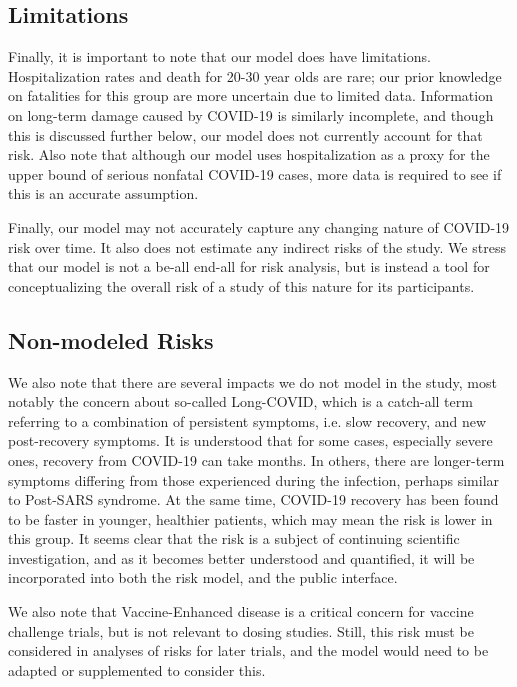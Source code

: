 \documentclass{article}
\begin{document}
\subsection{Limitations}

Finally, it is important to note that our model does have limitations. Hospitalization rates and death for 20-30 year olds are rare; our prior knowledge on fatalities for this group are more uncertain due to limited data. Information on long-term damage caused by COVID-19 is similarly incomplete, and though this is discussed further below, our model does not currently account for that risk. Also note that although our model uses hospitalization as a proxy for the upper bound of serious nonfatal COVID-19 cases, more data is required to see if this is an accurate assumption. 

Finally, our model may not accurately capture any changing nature of COVID-19 risk over time. It also does not estimate any indirect risks of the study. 
We stress that our model is not a be-all end-all for risk analysis, but is instead a tool for conceptualizing the overall risk of a study of this nature for its participants.

\subsection{Non-modeled Risks}

We also note that there are several impacts we do not model in the study, most notably the concern about so-called Long-COVID, which is a catch-all term referring to a combination of persistent symptoms, i.e. slow recovery, and new post-recovery symptoms\cite{carfi2020persistent}. It is understood that for some cases, especially severe ones, recovery from COVID-19 can take months. In others, there are longer-term symptoms differing from those experienced during the infection, perhaps similar to Post-SARS syndrome\cite{perrin2020into, moldofsky2011chronic}. At the same time, COVID-19 recovery has been found to be faster in younger, healthier patients\cite{tenforde2020symptom}, which may mean the risk is lower in this group. It seems clear that the risk is a subject of continuing scientific investigation, and as it becomes better understood and quantified, it will be incorporated into both the risk model, and the public interface.  

We also note that Vaccine-Enhanced disease is a critical concern for vaccine challenge trials, but is not relevant to dosing studies. Still, this risk must be considered in analyses of risks for later trials, and the model would need to be adapted or supplemented to consider this.
\end{document}
